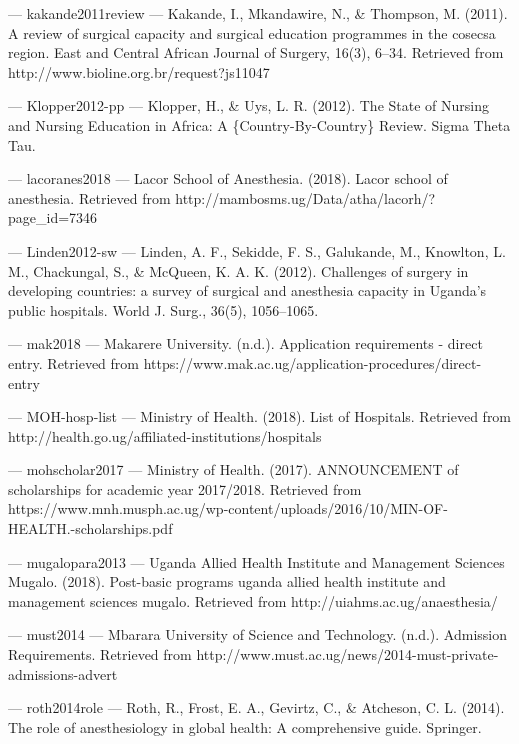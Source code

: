 \documentclass[11pt]{article}
\begin{document}
\hypertarget{ref-kakande2011review}{}
--- kakande2011review --- Kakande, I., Mkandawire, N., \& Thompson, M.
(2011). A review of surgical capacity and surgical education programmes
in the cosecsa region. East and Central African Journal of Surgery,
16(3), 6--34. Retrieved from http://www.bioline.org.br/request?js11047

\hypertarget{ref-Klopper2012-pp}{}
--- Klopper2012-pp --- Klopper, H., \& Uys, L. R. (2012). The State of
Nursing and Nursing Education in Africa: A \{Country-By-Country\}
Review. Sigma Theta Tau.

\hypertarget{ref-lacoranes2018}{}
--- lacoranes2018 --- Lacor School of Anesthesia. (2018). Lacor school
of anesthesia. Retrieved from
http://mambosms.ug/Data/atha/lacorh/?page\_id=7346

\hypertarget{ref-Linden2012-sw}{}
--- Linden2012-sw --- Linden, A. F., Sekidde, F. S., Galukande, M.,
Knowlton, L. M., Chackungal, S., \& McQueen, K. A. K. (2012). Challenges
of surgery in developing countries: a survey of surgical and anesthesia
capacity in Uganda's public hospitals. World J. Surg., 36(5),
1056--1065.

\hypertarget{ref-mak2018}{}
--- mak2018 --- Makarere University. (n.d.). Application requirements -
direct entry. Retrieved from
https://www.mak.ac.ug/application-procedures/direct-entry

\hypertarget{ref-MOH-hosp-list}{}
--- MOH-hosp-list --- Ministry of Health. (2018). List of Hospitals.
Retrieved from http://health.go.ug/affiliated-institutions/hospitals

\hypertarget{ref-mohscholar2017}{}
--- mohscholar2017 --- Ministry of Health. (2017). ANNOUNCEMENT of
scholarships for academic year 2017/2018. Retrieved from
https://www.mnh.musph.ac.ug/wp-content/uploads/2016/10/MIN-OF-HEALTH.-scholarships.pdf

\hypertarget{ref-mugalopara2013}{}
--- mugalopara2013 --- Uganda Allied Health Institute and Management
Sciences Mugalo. (2018). Post-basic programs uganda allied health
institute and management sciences mugalo. Retrieved from
http://uiahms.ac.ug/anaesthesia/

\hypertarget{ref-must2014}{}
--- must2014 --- Mbarara University of Science and Technology. (n.d.).
Admission Requirements. Retrieved from
http://www.must.ac.ug/news/2014-must-private-admissions-advert

\hypertarget{ref-roth2014role}{}
--- roth2014role --- Roth, R., Frost, E. A., Gevirtz, C., \& Atcheson,
C. L. (2014). The role of anesthesiology in global health: A
comprehensive guide. Springer.
\end{document}

